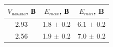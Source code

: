 \documentclass[12pt,a4paper]{article}
\begin{document}
\begin{figure}[H]
\begin{minipage}[h]{0.49\linewidth}
 \\
\end{minipage}
\hfill
\begin{minipage}[h]{0.49\linewidth}
 \\ 
\end{minipage}
\end{figure}

\begin{center}
\begin{tabular}{|c|c|c|}
 \hline 
 $V_\text{накала}$, В  & $E_{max}$, В & $E_{min}$, B  \\ 
 \hline 
 2.93 & 1.8 $\pm$ 0.2 & 6.1 $\pm$ 0.2 \\ 
 \hline 
 2.56  & 1.9 $\pm$ 0.2 & 7.0 $\pm$ 0.2 \\ 
 \hline 
 \end{tabular}  
\end{center}
\end{document}
